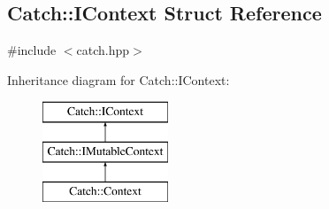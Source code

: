 \hypertarget{structCatch_1_1IContext}{\subsection{Catch\-:\-:I\-Context Struct Reference}
\label{structCatch_1_1IContext}
}


{\ttfamily \#include $<$catch.\-hpp$>$}

Inheritance diagram for Catch\-:\-:I\-Context\-:\begin{figure}[H]
\begin{center}
\leavevmode
\includegraphics[height=3.000000cm]{structCatch_1_1IContext}
\end{center}
\end{figure}
